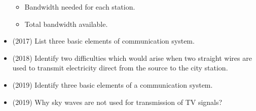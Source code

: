 \documentclass{article}
\begin{document}
\begin{itemize}
 \begin{itemize}
\item  Bandwidth needed for each station.
\item  Total bandwidth available. 
\end{itemize}
\item (2017)  List three basic elements of communication system. 
\item (2018)  Identify two difficulties which would arise when two straight wires are used to transmit electricity direct from the source to the city station. 
\item (2019)  Identify three basic elements of a communication system. 
\item (2019)  Why sky waves are not used for transmission of TV signals? 
\end{itemize}
\end{document}
